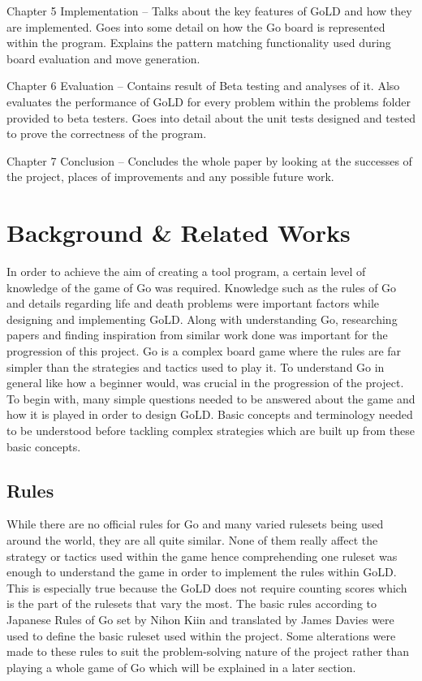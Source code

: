 \documentclass{l4proj}
\begin{document}
Chapter 5 Implementation – Talks about the key features of GoLD and how they are implemented. Goes into some detail on how the Go board is represented within the program. Explains the pattern matching functionality used during board evaluation and move generation.

Chapter 6 Evaluation – Contains result of Beta testing and analyses of it. Also evaluates the performance of GoLD for every problem within the problems folder provided to beta testers. Goes into detail about the unit tests designed and tested to prove the correctness of the program.

Chapter 7 Conclusion – Concludes the whole paper by looking at the successes of the project, places of improvements and any possible future work.





\chapter{Background \& Related Works}
In order to achieve the aim of creating a tool program, a certain level of knowledge of the game of Go was required. Knowledge such as the rules of Go and details regarding life and death problems were important factors while designing and implementing GoLD. Along with understanding Go, researching papers and finding inspiration from similar work done was important for the progression of this project.
Go is a complex board game where the rules are far simpler than the strategies and tactics used to play it. To understand Go in general like how a beginner would,  was crucial in the progression of the project. To begin with, many simple questions needed to be answered about the game and how it is played in order to design GoLD. Basic concepts and terminology needed to be understood before tackling complex strategies which are built up from these basic concepts.

\section{Rules}

While there are no official rules for Go and many varied rulesets being used around the world, they are all quite similar. None of them really affect the strategy or tactics used within the game hence comprehending one ruleset was enough to understand the game in order to implement the rules within GoLD. This is especially true because the GoLD does not require counting scores which is the part of the rulesets that vary the most. The basic rules according to Japanese Rules of Go set by Nihon Kiin and translated by James Davies \cite{NihonKiinRules} were used to define the basic ruleset used within the project. Some alterations were made to these rules to suit the problem-solving nature of the project rather than playing a whole game of Go which will be explained in a later section.
\end{document}
